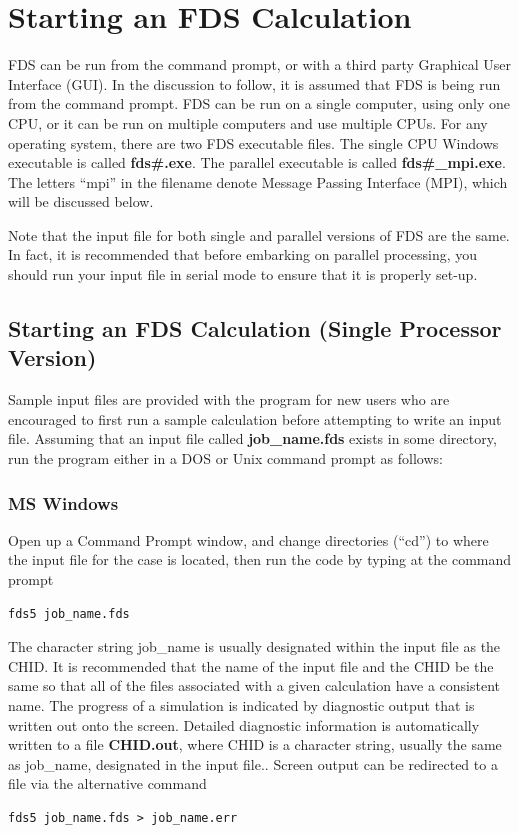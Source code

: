 \documentclass[11pt]{book}
\begin{document}
\section{Starting an FDS Calculation}

FDS can be run from the command prompt, or with a third party Graphical User Interface (GUI).
In the discussion to follow, it is assumed that FDS is being run from the command prompt.
FDS can be run on a single computer, using only one CPU, or it can be run on multiple
computers and use multiple CPUs. For any operating system, there are two FDS executable files.
The single CPU Windows executable is called {\bf fds\#.exe}.
The parallel executable is called {\bf fds\#\_mpi.exe}. The letters ``mpi'' in the filename denote
Message Passing Interface (MPI), which will be discussed below.

\begin{warning}
\noindent
Note that the input file for both single and parallel versions of FDS are the same.
In fact, it is recommended that before embarking on parallel processing, you should run your input
file in serial mode to ensure that it is properly set-up.
\end{warning}


\subsection{Starting an FDS Calculation (Single Processor Version)}

Sample input files are provided with the program for new users who
are encouraged to first run a sample calculation before attempting to
write an input file. Assuming that an input file called {\bf job\_name.fds}
exists in some directory, run the program either in a DOS or Unix command prompt as follows:


\subsubsection{MS Windows}

Open up a Command Prompt window, and change directories (``cd'') to where the
input file for the case is located, then run the code by typing at the command prompt
\begin{verbatim}
fds5 job_name.fds
\end{verbatim}
The character string {\ct job\_name} is usually
designated within the input file as the {\ct CHID}. It is recommended that the
name of the input file and the {\ct CHID} be the same so that all of the
files associated with a given calculation have a consistent name.
The progress of a simulation is indicated by diagnostic output that is written out onto the screen.
Detailed diagnostic information is automatically
written to a file {\bf CHID.out}, where {\ct CHID} is a character
string, usually the same as {\ct job\_name}, designated in the input file..
Screen output can be redirected to a file via the alternative command
\begin{verbatim}
fds5 job_name.fds > job_name.err
\end{verbatim}
\end{document}
